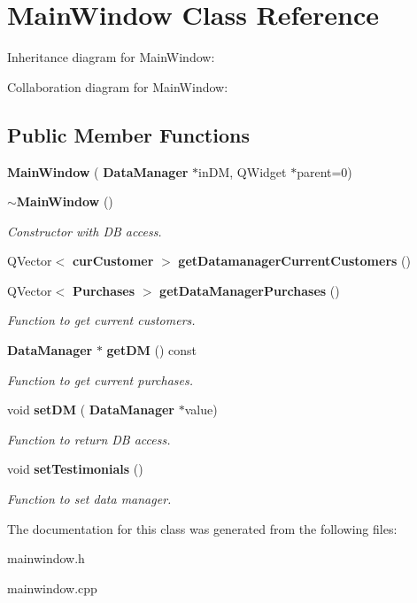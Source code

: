 \section{Main\+Window Class Reference}
\label{class_main_window}


Inheritance diagram for Main\+Window\+:


Collaboration diagram for Main\+Window\+:
\subsection*{Public Member Functions}
\begin{DoxyCompactItemize}
\item 
\mbox{\label{class_main_window_a7adf540c18b73adfd79cce712edeaedf}} 
{\bfseries Main\+Window} (\textbf{ Data\+Manager} $\ast$in\+DM, Q\+Widget $\ast$parent=0)
\item 
\mbox{\label{class_main_window_ae98d00a93bc118200eeef9f9bba1dba7}} 
\textbf{ $\sim$\+Main\+Window} ()
\begin{DoxyCompactList}\small\item\em Constructor with DB access. \end{DoxyCompactList}\item 
\mbox{\label{class_main_window_a7ffaefaae7e93393041ccdbbd879f9a2}} 
Q\+Vector$<$ \textbf{ cur\+Customer} $>$ {\bfseries get\+Datamanager\+Current\+Customers} ()
\item 
\mbox{\label{class_main_window_a1f39a84859a651171ca13e887e91037a}} 
Q\+Vector$<$ \textbf{ Purchases} $>$ \textbf{ get\+Data\+Manager\+Purchases} ()
\begin{DoxyCompactList}\small\item\em Function to get current customers. \end{DoxyCompactList}\item 
\mbox{\label{class_main_window_a693c0f93748d8d865fdc3318391c62a2}} 
\textbf{ Data\+Manager} $\ast$ \textbf{ get\+DM} () const
\begin{DoxyCompactList}\small\item\em Function to get current purchases. \end{DoxyCompactList}\item 
\mbox{\label{class_main_window_ab6bd8c9acec077da869a86d9aa743ed9}} 
void \textbf{ set\+DM} (\textbf{ Data\+Manager} $\ast$value)
\begin{DoxyCompactList}\small\item\em Function to return DB access. \end{DoxyCompactList}\item 
\mbox{\label{class_main_window_a02081ede1799aabe0df8ec1ee4a26b05}} 
void \textbf{ set\+Testimonials} ()
\begin{DoxyCompactList}\small\item\em Function to set data manager. \end{DoxyCompactList}\end{DoxyCompactItemize}


The documentation for this class was generated from the following files\+:\begin{DoxyCompactItemize}
\item 
mainwindow.\+h\item 
mainwindow.\+cpp\end{DoxyCompactItemize}
